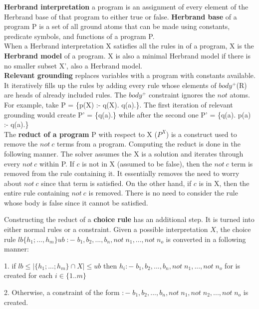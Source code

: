 \textbf{Herbrand interpretation} a program is an assignment of every element of the Herbrand base of that program to either true or false. \textbf{Herbrand base} of a program P is a set of all ground atoms that can be made using constants, predicate symbols, and functions of a program P.\\

When a Herbrand interpretation X satisfies all the rules in of a program, X is the \textbf{Herbrand model} of a program. X is also a minimal Herbrand model if there is no smaller subset X', also a Herbrand model.\\

\textbf{Relevant grounding} replaces variables with a program with constants available.
It iteratively fills up the rules by adding every rule whose elements of $body^+$(R) are heads of already included rules. 
The $body^+$ constraint ignores the $not$ atoms. 
For example, take P = \{p(X) :- q(X). q(a).\}. 
The first iteration of relevant grounding would create P' = \{q(a).\} while after the second one P' = \{q(a). p(a) :- q(a).\}\\

The \textbf{reduct of a program} P with respect to X ($P^X$) is a construct used to remove the $not\: c$ terms from a program.
Computing the reduct is done in the following manner. The solver assumes the X is a solution and iterates through every $not\: c$ within P. 
If $c$ is not in X (assumed to be false), then the $not\: c$ term is removed from the rule containing it. 
It essentially removes the need to worry about $not\: c$ since that term is satisfied.
On the other hand, if $c$ is in X, then the entire rule containing $not\: c$ is removed.
There is no need to consider the rule whose body is false since it cannot be satisfied.

Constructing the reduct of a \textbf{choice rule} has an additional step.
It is turned into either normal rules or a constraint.
Given a possible interpretation $X$, the choice rule $lb\{h_1; ..., h_m\}ub\; :- \;  b_1, b_2, ..., b_n, not\; n_1, ..., not\; n_o$ is converted in a following manner:

1. if $ lb \leq |\{h_1; ...; h_m\} \cap X| \leq ub$ then $h_i :- \;  b_1, b_2, ..., b_n, not\; n_1, ..., not\; n_o$ for is created for each $i \in \{1..m\}$

2. Otherwise, a constraint of the form $ :- \;  b_1, b_2, ..., b_n, not\; n_1, not\; n_2, ..., not\; n_o$ 
is created.\\


